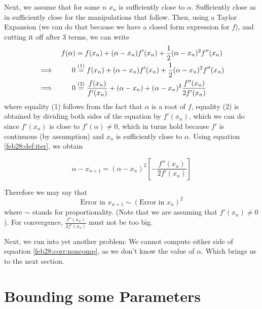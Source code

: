 Next, we assume that for some $n$ $x_n$ is sufficiently close to $\alpha$. Sufficiently close as in sufficiently close for the manipulations that follow. Then, using a Taylor Expansion (we can do that because we have a closed form expression for $f$), and cutting it off after 3 terms, we can write
\begin{alignat*}{3}
  &&f(\alpha)
  &=
    f(x_n) + (\alpha - x_n)f'(x_n) + \frac 12 (\alpha - x_n)^2f''(x_n) \\
  \implies&&
  0
  &\overset{(1)}{=}
  f(x_n) + (\alpha - x_n)f'(x_n) + \frac 12 (\alpha - x_n)^2f''(x_n) \\
  \implies&&
  0
  &\overset{(2)}{=}
  \frac{f(x_n)}{f'(x_n)} + (\alpha - x_n) + (\alpha - x_n)^2\frac{f''(x_n)}{2f'(x_n)} \\
\end{alignat*}
where equality (1) follows from the fact that $\alpha$ is a root of $f$, equality (2) is obtained by dividing both sides of the equation by $f'(x_n)$, which we can do since $f'(x_n)$ is close to $f'(\alpha) \neq 0$, which in turns hold because $f'$ is continuous (by assumption) and $x_n$ is sufficiently close to $\alpha$. Using equation \ref{feb28:def:iter}, we obtain
\begin{corr}
  \label{feb28:corr:noncomp}
  \[
    \alpha - x_{n+1} = (\alpha - x_n)^2\left[-\frac{f''(x_n)}{2f'(x_n)}\right]
  \]
\end{corr}
Therefore we may say that
\[
  \text{Error in $x_{n+1}$}
  \sim
  \left(\text{Error in $x_{n}$}\right)^2
\]
where $\sim$ stands for proportionality. (Note that we are assuming that $f'(x_n) \neq 0$). For convergence, $\frac{f''(x_n)}{2f'(x_n)}$ must not be too big.

Next, we run into yet another problem: We cannot compute either side of equation \ref{feb28:corr:noncomp}, as we don't know the value of $\alpha$. Which brings us to the next section.

\section{Bounding some Parameters}

